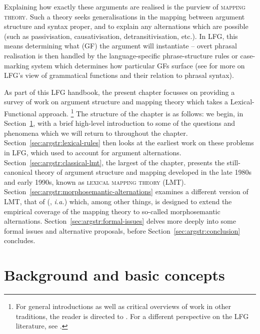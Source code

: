 \documentclass[output=paper]{langscibook}
\begin{document}
Explaining how exactly these arguments are realised is the purview of
\textsc{mapping theory}. Such a theory seeks generalisations in the mapping
between argument structure and syntax proper, and to explain any alternations
which are possible (such as passivisation, causativisation, detransitivisation,
etc.). In LFG, this means determining what  (GF) the
argument will instantiate -- overt phrasal realisation is then handled by the
language-specific phrase-structure rules or case-marking system which determines
how particular GFs surface (see  for more on LFG's view of grammatical functions and their
relation to phrasal syntax).

As part of this LFG handbook, the present chapter focusses on providing a survey
of work on argument structure and mapping theory which takes a
Lexical-Functional approach.%
%
\footnote{For general introductions as well as critical overviews of work in
  other traditions, the reader is directed to
  \citet[][]{Grimshaw90,comrie:argument-structure,levin-hovav05,ramchand:argument-structure,williams:arguments}.
  For a different perspective on the LFG literature, see
  \citet[ch.~9]{DLM:LFG}.}
%
The structure of the chapter is as follows: we begin, in
Section~\ref{sec:argstr:meta-questions}, with a brief high-level introduction to some
of the questions and phenomena which we will return to throughout the chapter.
Section~\ref{sec:argstr:lexical-rules} then looks at the earliest work on these
problems in LFG, which used  to account for argument
alternations. Section~\ref{sec:argstr:classical-lmt}, the largest of the chapter,
presents the still-canonical theory of argument structure and mapping developed
in the late 1980s and early 1990s, known as \textsc{lexical mapping theory}
(LMT). Section~\ref{sec:argstr:morphosemantic-alternations} examines a different
version of LMT, that of \citeauthor{Kibort2007} (\citeyear{Kibort2007},
\textit{i.a.}) which, among other things, is designed to extend the empirical
coverage of the mapping theory to so-called morphosemantic alternations.
Section~\ref{sec:argstr:formal-issues} delves more deeply into some formal issues and
alternative proposals, before Section~\ref{sec:argstr:conclusion} concludes.


\section{Background and basic concepts}
\label{sec:argstr:meta-questions}
\end{document}
